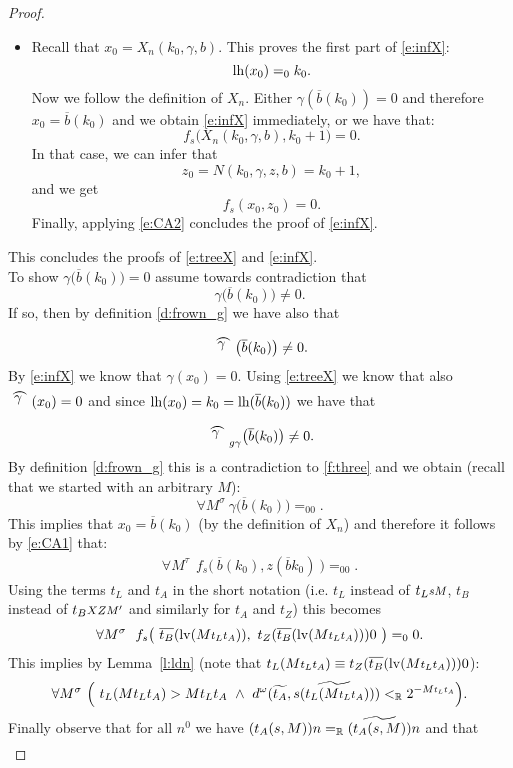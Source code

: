 \begin{proof}
\begin{itemize}
\item Recall that $x_0 = X_n(k_0,\gamma,b) $.
This proves the first part of \eqref{e:infX}:
\[\operatorname{lh}(x_0)=_0 k_0.\]
Now we follow the definition of $X_n$. Either $\gamma (\overline{b}(k_0)) = 0$ 
and therefore
$x_0= \overline{b}(k_0)$ and we  
obtain \eqref{e:infX} immediately, or we have that:
\[
f_s\big( X_n(k_0,\gamma,b), k_0+1 \big) = 0.
\]
In that case, we can infer that 
\[z_0 =
   N(k_0,\gamma, z, b) = k_0+1,\]
and we get 
\[
f_s( x_0, z_0 ) = 0.
\]  
Finally, applying \eqref{e:CA2} concludes the proof of \eqref{e:infX}.
\end{itemize}
This concludes the proofs of \eqref{e:treeX} and \eqref{e:infX}.\\
To show $\gamma\big(\overline{b}(k_0)\big)=0$ assume towards contradiction that
\[\gamma\big(\overline{b}(k_0)\big)\neq 0.\]
If so, then by definition \ref{d:frown_g} we have also that
\[\widefr{\gamma}\big(\overline{b}(k_0)\big)\neq 0.\]
By \eqref{e:infX} we know that $\gamma(x_0)=0$. Using \eqref{e:treeX} we know 
that also $\widefr{\gamma}(x_0)=0$ and since $\operatorname{lh}(x_0)=k_0
=\operatorname{lh}(\overline{b}(k_0))$ we have that
\[
\widefr{\gamma}_{g\gamma}\big(\overline{b}(k_0)\big)\neq0.
\]
By definition \ref{d:frown_g} this is a contradiction to \eqref{f:three} and 
we obtain (recall that we started with an arbitrary $M$):
\[
 \forall M^{\sigma}\ \gamma\big(\overline{b}(k_0)\big)=_00
\text{.}
\]
This implies that $x_0=\overline{b}(k_0)$ (by the definition of $X_n$) and 
therefore it follows by \eqref{e:CA1} that:
\begin{align*}
 \forall M^{\tau} \ \ f_s\big(\ \overline{b}(k_0), z(\overline{b}k_0) \ \big) 
=_00
\text{.}
\end{align*}
Using the terms $t_L$ and $t_A$ in the short notation 
(i.e. $t_L$ instead of $t_L\args{sM}$, $t_B$ instead of $t_B\args{XZM'}$ and 
similarly for $t_A$ and $t_Z$)
this becomes
\begin{align*}
 \forall M^{\sigma} \ \ f_s\bigl(\  
     \overline{t_B}(\l(M\args{t_Lt_A})),\ 
     t_Z(\overline{t_B}
                   (\l(M\args{t_Lt_A})))0
 \ \bigr)=_00
\text{.}
\end{align*}
This implies by Lemma~\ref{l:ldn} (note that 
$t_L(M\args{t_Lt_A})\equiv t_Z(\overline{t_B}(\l(M\args{t_Lt_A})))0$):
\[
\forall M^{\sigma}\ 
\Big(\ t_L(Mt_Lt_A) > Mt_Lt_A\  \wedge\ 
  d^\omega(\widetilde{t_A},\widetilde{s (t_L(M\args{t_Lt_A})) })
<_\RR 2^{ -M\args{t_Lt_A} } \Big)
\text{.}
\] Finally observe that for all $n^0$ we have $(t_A(s,M))n=_{\mathbb{R}} \widetilde{(t_A(s,M))}n$ 
and that
\begin{align*} 

\end{align*}
\end{proof}
